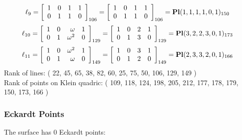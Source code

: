 \documentclass{article}
\begin{document}
{$$
\ell_{9} = 
\left[
\begin{array}{*{4}{r}}
1 & 0 & 1 & 1\\
0 & 1 & 1 & 0\\
\end{array}
\right]
_{106}
=
\left[
\begin{array}{*{4}c}
1  & 0  & 1  & 1\\
0  & 1  & 1  & 0\\
\end{array}
\right]_{106}
={\rm\bf Pl}(1,1,1,1,0,1 )_{150}$$
$$
\ell_{10} = 
\left[
\begin{array}{*{4}{r}}
1 & 0 & \omega  & 1\\
0 & 1 & \omega^{2} & 0\\
\end{array}
\right]
_{129}
=
\left[
\begin{array}{*{4}c}
1  & 0  & 2  & 1\\
0  & 1  & 3  & 0\\
\end{array}
\right]_{129}
={\rm\bf Pl}(3,2,2,3,0,1 )_{173}$$
$$
\ell_{11} = 
\left[
\begin{array}{*{4}{r}}
1 & 0 & \omega^{2} & 1\\
0 & 1 & \omega  & 0\\
\end{array}
\right]
_{149}
=
\left[
\begin{array}{*{4}c}
1  & 0  & 3  & 1\\
0  & 1  & 2  & 0\\
\end{array}
\right]_{149}
={\rm\bf Pl}(2,3,3,2,0,1 )_{166}$$
Rank of lines: ( 22, 45, 65, 38, 82, 60, 25, 75, 50, 106, 129, 149 )\\
Rank of points on Klein quadric: ( 109, 118, 124, 198, 205, 212, 177, 178, 179, 150, 173, 166 )\\
\subsubsection*{Eckardt Points}
The surface has 0 Eckardt points:\\
}
\end{document}
